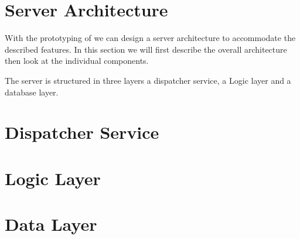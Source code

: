 \section{Server Architecture}
\label{sec:server}
With the prototyping of  we can design a server architecture to accommodate the described features. In this section we will first describe the overall architecture then look at the individual components.


The server is structured in three layers a dispatcher service, a Logic layer and a database layer. 




\section{Dispatcher Service}




\section{Logic Layer}




\section{Data Layer}


